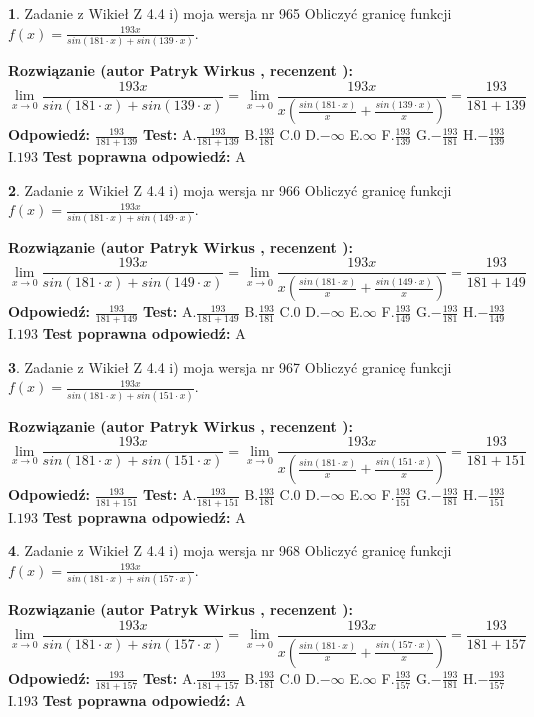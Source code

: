 \documentclass[12pt, a4paper]{article}
\theoremstyle{definition} %
\newtheorem{zad}{}
\newcommand{\zadStart}[1]{\begin{zad}#1\newline}
\newcommand{\zadStop}{\end{zad}}
\newcommand{\rozwStart}[2]{\noindent \textbf{Rozwiązanie (autor #1 , recenzent #2): }\newline}
\newcommand{\rozwStop}{\newline}
\newcommand{\odpStart}{\noindent \textbf{Odpowiedź:}\newline}
\newcommand{\odpStop}{\newline}
\newcommand{\testStart}{\noindent \textbf{Test:}\newline}
\newcommand{\testStop}{\newline}
\newcommand{\kluczStart}{\noindent \textbf{Test poprawna odpowiedź:}\newline}
\newcommand{\kluczStop}{\newline}
\begin{document}
\zadStart{Zadanie z Wikieł Z 4.4 i) moja wersja nr 965}
Obliczyć granicę funkcji $f(x)=\frac{193x}{sin(181\cdot x) +sin(139\cdot x)}$.
\zadStop
\rozwStart{Patryk Wirkus}{}
$$\lim\limits_{x\to 0}\frac{193x}{sin(181\cdot x) +sin(139\cdot x)}=\lim\limits_{x\to 0}\frac{193x}{x(\frac{sin(181\cdot x)}{x}+\frac{sin(139\cdot x)}{x})}=\frac{193}{181+139}$$
\rozwStop
\odpStart
$\frac{193}{181+139}$
\odpStop
\testStart
A.$\frac{193}{181+139}$
B.$\frac{193}{181}$
C.$0$
D.$-\infty$
E.$\infty$
F.$\frac{193}{139}$
G.$-\frac{193}{181}$
H.$-\frac{193}{139}$
I.$193$
\testStop
\kluczStart
A
\kluczStop



\zadStart{Zadanie z Wikieł Z 4.4 i) moja wersja nr 966}
Obliczyć granicę funkcji $f(x)=\frac{193x}{sin(181\cdot x) +sin(149\cdot x)}$.
\zadStop
\rozwStart{Patryk Wirkus}{}
$$\lim\limits_{x\to 0}\frac{193x}{sin(181\cdot x) +sin(149\cdot x)}=\lim\limits_{x\to 0}\frac{193x}{x(\frac{sin(181\cdot x)}{x}+\frac{sin(149\cdot x)}{x})}=\frac{193}{181+149}$$
\rozwStop
\odpStart
$\frac{193}{181+149}$
\odpStop
\testStart
A.$\frac{193}{181+149}$
B.$\frac{193}{181}$
C.$0$
D.$-\infty$
E.$\infty$
F.$\frac{193}{149}$
G.$-\frac{193}{181}$
H.$-\frac{193}{149}$
I.$193$
\testStop
\kluczStart
A
\kluczStop



\zadStart{Zadanie z Wikieł Z 4.4 i) moja wersja nr 967}
Obliczyć granicę funkcji $f(x)=\frac{193x}{sin(181\cdot x) +sin(151\cdot x)}$.
\zadStop
\rozwStart{Patryk Wirkus}{}
$$\lim\limits_{x\to 0}\frac{193x}{sin(181\cdot x) +sin(151\cdot x)}=\lim\limits_{x\to 0}\frac{193x}{x(\frac{sin(181\cdot x)}{x}+\frac{sin(151\cdot x)}{x})}=\frac{193}{181+151}$$
\rozwStop
\odpStart
$\frac{193}{181+151}$
\odpStop
\testStart
A.$\frac{193}{181+151}$
B.$\frac{193}{181}$
C.$0$
D.$-\infty$
E.$\infty$
F.$\frac{193}{151}$
G.$-\frac{193}{181}$
H.$-\frac{193}{151}$
I.$193$
\testStop
\kluczStart
A
\kluczStop



\zadStart{Zadanie z Wikieł Z 4.4 i) moja wersja nr 968}
Obliczyć granicę funkcji $f(x)=\frac{193x}{sin(181\cdot x) +sin(157\cdot x)}$.
\zadStop
\rozwStart{Patryk Wirkus}{}
$$\lim\limits_{x\to 0}\frac{193x}{sin(181\cdot x) +sin(157\cdot x)}=\lim\limits_{x\to 0}\frac{193x}{x(\frac{sin(181\cdot x)}{x}+\frac{sin(157\cdot x)}{x})}=\frac{193}{181+157}$$
\rozwStop
\odpStart
$\frac{193}{181+157}$
\odpStop
\testStart
A.$\frac{193}{181+157}$
B.$\frac{193}{181}$
C.$0$
D.$-\infty$
E.$\infty$
F.$\frac{193}{157}$
G.$-\frac{193}{181}$
H.$-\frac{193}{157}$
I.$193$
\testStop
\kluczStart
A
\kluczStop
\end{document}
